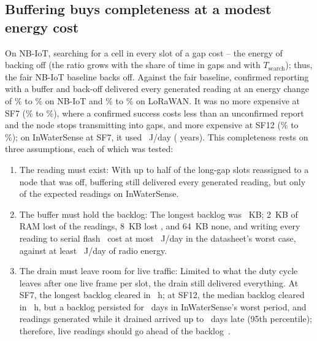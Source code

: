 \subsection{Buffering buys completeness at a modest energy cost}
\label{sec:hand-buffer}
On NB-IoT, searching for a cell in every slot of a gap cost \backoffMin--\backoffMax{} the energy of backing off (the ratio grows with the share of time in gaps and with $T_\mathrm{search}$); thus, the fair NB-IoT baseline backs off. Against the fair baseline, confirmed reporting with a buffer and back-off delivered every generated reading at an energy change of \bufNbMin\% to \bufNbMax\% on NB-IoT and \bufLoMin\% to \bufLoMax\% on LoRaWAN. It was no more expensive at SF7 (\bufSevenMin\% to \bufSevenMax\%), where a confirmed success costs less than an unconfirmed report and the node stops transmitting into gaps, and more expensive at SF12 (\bufTwelveMin\% to \bufTwelveMax\%); on InWaterSense at SF7, it used \inwSevenBufE~J/day (\inwSevenBufLife{} years). This completeness rests on three assumptions, each of which was tested:
\begin{enumerate}
\item The reading must exist: With up to half of the long-gap slots reassigned to a node that was off, buffering still delivered every generated reading, but only \offExpectedInws{} of the expected readings on InWaterSense.
\item The buffer must hold the backlog: The longest backlog was \maxBufferKB~KB; 2~KB of RAM lost \ramLossTwo{} of the readings, 8~KB lost \ramLossEight, and 64~KB none, and writing every reading to serial flash~\cite{winbond2018w25q128jv} cost at most \flashJDayMax~J/day in the datasheet's worst case, against at least \radioJDayMin~J/day of radio energy.
\item The drain must leave room for live traffic: Limited to what the duty cycle leaves after one live frame per slot, the drain still delivered everything. At SF7, the longest backlog cleared in \drainSevenMaxH~h; at SF12, the median backlog cleared in \drainTwelveMedH~h, but a backlog persisted for \drainTwelveMaxD~days in InWaterSense's worst period, and readings generated while it drained arrived up to \drainTwelveLiveP~days late (95th percentile); therefore, live readings should go ahead of the backlog~\cite{ingelrest2010sensorscope}.
\end{enumerate}

